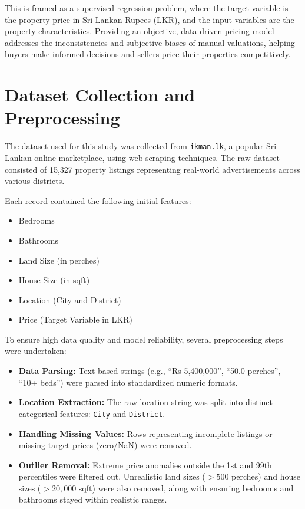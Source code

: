 \documentclass[12pt]{article}
\begin{document}
This is framed as a supervised regression problem, where the target variable is the property price in Sri Lankan Rupees (LKR), and the input variables are the property characteristics. Providing an objective, data-driven pricing model addresses the inconsistencies and subjective biases of manual valuations, helping buyers make informed decisions and sellers price their properties competitively.

\section{Dataset Collection and Preprocessing}
The dataset used for this study was collected from \texttt{ikman.lk}, a popular Sri Lankan online marketplace, using web scraping techniques. The raw dataset consisted of 15,327 property listings representing real-world advertisements across various districts.

Each record contained the following initial features:
\begin{itemize}
    \item Bedrooms
    \item Bathrooms
    \item Land Size (in perches)
    \item House Size (in sqft)
    \item Location (City and District)
    \item Price (Target Variable in LKR)
\end{itemize}

To ensure high data quality and model reliability, several preprocessing steps were undertaken:
\begin{itemize}
    \item \textbf{Data Parsing:} Text-based strings (e.g., ``Rs 5,400,000'', ``50.0 perches'', ``10+ beds'') were parsed into standardized numeric formats.
    \item \textbf{Location Extraction:} The raw location string was split into distinct categorical features: \texttt{City} and \texttt{District}.
    \item \textbf{Handling Missing Values:} Rows representing incomplete listings or missing target prices (zero/NaN) were removed.
    \item \textbf{Outlier Removal:} Extreme price anomalies outside the 1st and 99th percentiles were filtered out. Unrealistic land sizes ($>500$ perches) and house sizes ($>20,000$ sqft) were also removed, along with ensuring bedrooms and bathrooms stayed within realistic ranges.
\end{itemize}
\end{document}
